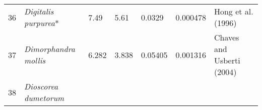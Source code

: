 \documentclass[]{article}
\begin{document}
\begin{longtable}[]{@{}lllllll@{}}
\begin{minipage}[t]{0.05\columnwidth}
36\strut
\end{minipage} & \begin{minipage}[t]{0.23\columnwidth}\raggedright
\emph{Digitalis purpurea}*\strut
\end{minipage} & \begin{minipage}[t]{0.05\columnwidth}\raggedright
7.49\strut
\end{minipage} & \begin{minipage}[t]{0.08\columnwidth}\raggedright
5.61\strut
\end{minipage} & \begin{minipage}[t]{0.08\columnwidth}\raggedright
0.0329\strut
\end{minipage} & \begin{minipage}[t]{0.08\columnwidth}\raggedright
0.000478\strut
\end{minipage} & \begin{minipage}[t]{0.23\columnwidth}\raggedright
Hong et al. (1996)\strut
\end{minipage}\tabularnewline
\begin{minipage}[t]{0.05\columnwidth}\raggedright
37\strut
\end{minipage} & \begin{minipage}[t]{0.23\columnwidth}\raggedright
\emph{Dimorphandra mollis}\strut
\end{minipage} & \begin{minipage}[t]{0.05\columnwidth}\raggedright
6.282\strut
\end{minipage} & \begin{minipage}[t]{0.08\columnwidth}\raggedright
3.838\strut
\end{minipage} & \begin{minipage}[t]{0.08\columnwidth}\raggedright
0.05405\strut
\end{minipage} & \begin{minipage}[t]{0.08\columnwidth}\raggedright
0.001316\strut
\end{minipage} & \begin{minipage}[t]{0.23\columnwidth}\raggedright
Chaves and Usberti (2004)\strut
\end{minipage}\tabularnewline
\begin{minipage}[t]{0.05\columnwidth}\raggedright
38\strut
\end{minipage} & \begin{minipage}[t]{0.23\columnwidth}\raggedright
\emph{Dioscorea dumetorum}\strut
\end{minipage} & \begin{minipage}[t]{0.05\columnwidth}\raggedright

\end{minipage}
\end{longtable}
\end{document}
